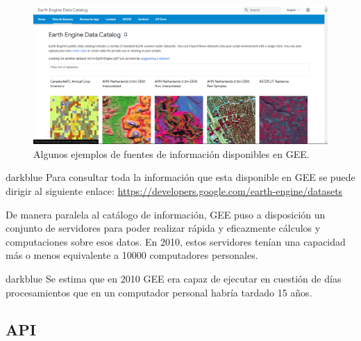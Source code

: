 \documentclass[
  12pt,
  letterpaper,
  twoside]{book}
\begin{document}
\begin{figure}[btp]

{\centering \includegraphics[width=1\linewidth]{Img/Datasets} 

}

\caption{Algunos ejemplos de fuentes de información disponibles en GEE.}\label{fig:unnamed-chunk-1}
\end{figure}

\begin{bluebox2}

\begin{awesomeblock}{5pt}{\faLightbulb}{darkblue}
Para consultar toda la información que esta disponible en GEE se puede dirigir al siguiente enlace: \url{https://developers.google.com/earth-engine/datasets}

\end{awesomeblock}

\end{bluebox2}

De manera paralela al catálogo de información, GEE puso a disposición un conjunto de servidores para poder realizar rápida y eficazmente cálculos y computaciones sobre esos datos. En 2010, estos servidores tenían una capacidad más o menos equivalente a 10000 computadores personales.

\begin{bluebox2}

\begin{awesomeblock}{5pt}{\faLightbulb}{darkblue}
Se estima que en 2010 GEE era capaz de ejecutar en cuestión de días procesamientos que en un computador personal habría tardado 15 años.

\end{awesomeblock}

\end{bluebox2}

\hypertarget{api}{%
\subsection{API}\label{api}}
\end{document}
